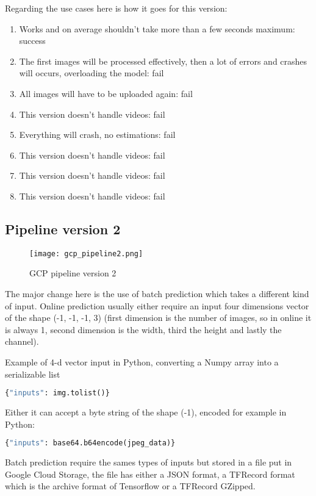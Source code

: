 Regarding the use cases here is how it goes for this version:
\begin{enumerate}
    \item Works and on average shouldn't take more than a few seconds maximum: success
    \item The first images will be processed effectively, then a lot of errors and crashes will occurs, overloading the model: fail
    \item All images will have to be uploaded again: fail
    \item This version doesn't handle videos: fail
    \item Everything will crash, no estimations: fail
    \item This version doesn't handle videos: fail
    \item This version doesn't handle videos: fail
    \item This version doesn't handle videos: fail
\end{enumerate}

\pagebreak\subsection{Pipeline version 2}
\begin{figure}[H]
    \centering 
    \texttt{[image: gcp\_pipeline2.png]}
	\caption{GCP pipeline version 2}
	\label{fig:pipelinev2}
\end{figure}

The major change here is the use of batch prediction which takes a different kind of input.
Online prediction usually either require an input four dimensions vector of the shape (-1, -1, -1, 3) (first dimension is the number of images, so in online it is always 1, second dimension is the width, third the height and lastly the channel).

Example of 4-d vector input in Python, converting a Numpy array into a serializable list
\begin{lstlisting}[language=Python]
{"inputs": img.tolist()}
\end{lstlisting}

Either it can accept a byte string of the shape (-1), encoded for example in Python:
\begin{lstlisting}[language=Python]
{"inputs": base64.b64encode(jpeg_data)}
\end{lstlisting}

\pagebreak
Batch prediction require the sames types of inputs but stored in a file put in Google Cloud Storage, the file has either a JSON format, a TFRecord format which is the archive format of Tensorflow or a TFRecord GZipped.

